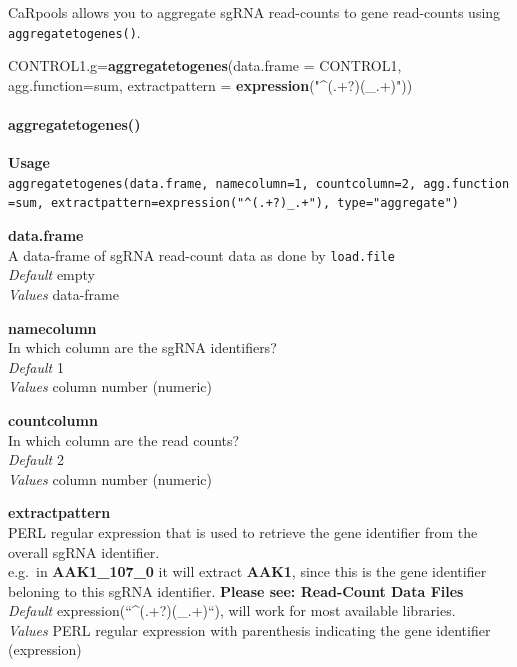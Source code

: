 \documentclass[]{article}
\newenvironment{Shaded}{\begin{snugshade}}{\end{snugshade}}
\newcommand{\KeywordTok}[1]{\textcolor[rgb]{0.13,0.29,0.53}{\textbf{{#1}}}}
\newcommand{\DataTypeTok}[1]{\textcolor[rgb]{0.13,0.29,0.53}{{#1}}}
\newcommand{\StringTok}[1]{\textcolor[rgb]{0.31,0.60,0.02}{{#1}}}
\newcommand{\NormalTok}[1]{{#1}}
\let\oldparagraph\paragraph
\renewcommand{\paragraph}[1]{\oldparagraph{#1}\mbox{}}
\begin{document}
CaRpools allows you to aggregate sgRNA read-counts to gene read-counts
using \texttt{aggregatetogenes()}.

\begin{Shaded}
\begin{Highlighting}[]
\NormalTok{CONTROL1.g=}\KeywordTok{aggregatetogenes}\NormalTok{(}\DataTypeTok{data.frame =} \NormalTok{CONTROL1, }\DataTypeTok{agg.function=}\NormalTok{sum,}
                            \DataTypeTok{extractpattern =} \KeywordTok{expression}\NormalTok{(}\StringTok{"^(.+?)(_.+)"}\NormalTok{))}
\end{Highlighting}
\end{Shaded}

\paragraph{aggregatetogenes()}\label{aggregatetogenes}

\textbf{Usage}\\
\texttt{aggregatetogenes(data.frame,\ namecolumn=1,\ countcolumn=2,\ agg.function=sum,\ extractpattern=expression("\^{}(.+?)\_.+"),\ type="aggregate")}

\textbf{data.frame}\\
A data-frame of sgRNA read-count data as done by \texttt{load.file}\\
\emph{Default} empty\\
\emph{Values} data-frame

\textbf{namecolumn}\\
In which column are the sgRNA identifiers?\\
\emph{Default} 1\\
\emph{Values} column number (numeric)

\textbf{countcolumn}\\
In which column are the read counts?\\
\emph{Default} 2\\
\emph{Values} column number (numeric)

\textbf{extractpattern}\\
PERL regular expression that is used to retrieve the gene identifier
from the overall sgRNA identifier.\\
e.g.~in \textbf{AAK1\_107\_0} it will extract \textbf{AAK1}, since this
is the gene identifier beloning to this sgRNA identifier. \textbf{Please
see: Read-Count Data Files}\\
\emph{Default} expression(``\^{}(.+?)(\_.+)``), will work for most
available libraries.\\
\emph{Values} PERL regular expression with parenthesis indicating the
gene identifier (expression)
\end{document}
